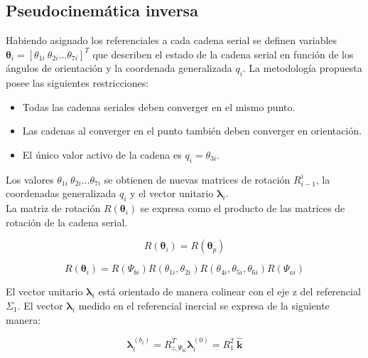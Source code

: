 \subsection{Pseudocinemática inversa}

Habiendo asignado los referenciales a cada cadena serial
se definen variables 
$\boldsymbol \theta_i = [\theta_{1i} \ \theta_{2i} \dots \theta_{7i}]^T$ que describen el estado
de la cadena serial en función de los ángulos de orientación
y la coordenada generalizada $q_i$.
La metodología propuesta posee las siguientes restricciones:
\begin{itemize}
  \item Todas las cadenas seriales deben converger en el mismo punto.
  \item Las cadenas al converger en el punto también 
  deben converger en orientación.
  \item El único valor activo de la cadena es $q_i = \theta_{3i}$.
\end{itemize}

Los valores $\theta_{1i} \ \theta_{2i} \dots \theta_{7i}$
se obtienen de nuevas matrices de rotación $R_{i-1}^i$,
la coordenadas generalizada $q_i$ y el vector unitario
$\boldsymbol \lambda_i$.\\

La matriz de rotación $R(\boldsymbol \theta_i)$ se expresa como el producto de las 
matrices de rotación de la cadena serial.

\begin{equation}
R(\boldsymbol \theta_i) = R(\boldsymbol \theta_p)
\end{equation}

\begin{equation} \label{eq: th_12-46}
R(\boldsymbol \theta_i) = R(\Psi_{bi})R(\theta_{1i},\theta_{2i})R(\theta_{4i},\theta_{5i},\theta_{6i})R(\Psi_{ai})
\end{equation}

El vector unitario $\boldsymbol \lambda_i$ está orientado
de manera colinear con el eje z del referencial $\Sigma_1$. 
El vector $\boldsymbol \lambda_i$ medido en el referencial inercial 
se expresa de la siguiente manera:

\begin{equation} \label{eq: th_12}
\boldsymbol \lambda_i^{(b_i)} = R^T_{z,\Psi_{bi}} \boldsymbol \lambda_i^{(0)} = R_{1}^{2} \ \mathbf{\hat{k}}
\end{equation}



